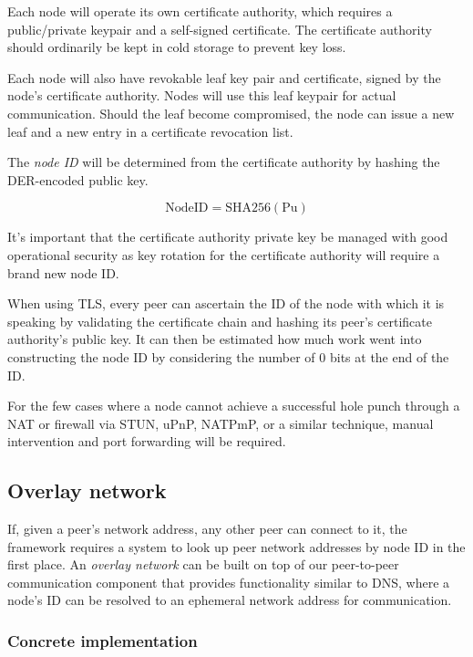 \documentclass[a4paper,10pt]{article} \usepackage[utf8]{inputenc}
\begin{document}
Each node will operate its own certificate authority, which requires a
public/private keypair and a self-signed certificate. The certificate authority
should ordinarily be kept in cold storage to prevent key loss.

Each node will also have revokable leaf key pair and certificate, signed by
the node's certificate authority. Nodes will use this leaf keypair for actual
communication. Should the leaf become compromised, the node can issue a new
leaf and a new entry in a certificate revocation list.

The {\em node ID} will be determined from the certificate authority
by hashing the DER-encoded public key.

\begin{equation}
\text{NodeID} = \text{SHA256}(\text{Pu})
\end{equation}

It's important that the certificate authority private key be managed with good
operational security as key rotation for the certificate authority will require
a brand new node ID.

When using TLS, every peer can ascertain the ID of the node with which it is
speaking by validating the certificate chain and hashing its peer's
certificate authority's public key. It can then be estimated how much work went
into constructing the node ID by considering the number of 0 bits at the end of
the ID.

For the few cases where a node cannot achieve a successful hole punch through a
NAT or firewall via STUN, uPnP, NATPmP, or a similar technique, manual
intervention and port forwarding will be required.

\subsection{Overlay network}

If, given a peer's network address, any other peer can connect to it, the
framework requires a system to look up peer network addresses by node ID in the
first place. An {\em overlay network} can be built on top of our peer-to-peer
communication component that provides functionality similar to DNS, where a
node's ID can be resolved to an ephemeral network address for communication.

\subsubsection{Concrete implementation}
\end{document}
